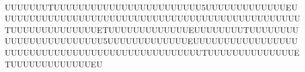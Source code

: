  UUUUUUUTUUUUUUUUUUUUUUUUUUUUUUUU5UUUUUUUUUUUUUEUUUUUUUUUUUUUUUUUUUUUUUUUUUUUUUUUUUUUUUUUUUUUUUUUTUUUUUUUUUUUUUUETUUUUUUUUUUUUUEUUUUUUUUTUUUUUUUUUUUUUUUUUUUUUUUU5UUUUUUUUUUUUUEUUUUUUUUUUUUUUUUUUUUUUUUUUUUUUUUUUUUUUUUUUUUUUUUUTUUUUUUUUUUUUUUETUUUUUUUUUUUUUEU
